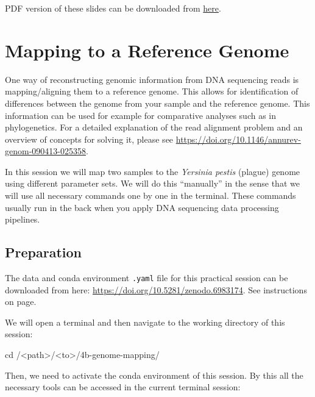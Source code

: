 \documentclass[
  letterpaper,
]{book}
\newenvironment{Shaded}{}{}
\newcommand{\BuiltInTok}[1]{\textcolor[rgb]{0.84,0.23,0.29}{#1}}
\newcommand{\NormalTok}[1]{\textcolor[rgb]{0.14,0.16,0.18}{#1}}
\newcommand{\OperatorTok}[1]{\textcolor[rgb]{0.14,0.16,0.18}{#1}}
\begin{document}
PDF version of these slides can be downloaded from
\href{assets/images/chapters/genome-mapping/SPAAM\%20Summer\%20School\%202022\%20-\%204B\%20-\%20Genome\%20Mapping.pdf}{here}.

\hypertarget{mapping-to-a-reference-genome}{%
\section{Mapping to a Reference
Genome}\label{mapping-to-a-reference-genome}}

One way of reconstructing genomic information from DNA sequencing reads
is mapping/aligning them to a reference genome. This allows for
identification of differences between the genome from your sample and
the reference genome. This information can be used for example for
comparative analyses such as in phylogenetics. For a detailed
explanation of the read alignment problem and an overview of concepts
for solving it, please see
\url{https://doi.org/10.1146/annurev-genom-090413-025358}.

In this session we will map two samples to the \emph{Yersinia pestis}
(plague) genome using different parameter sets. We will do this
``manually'' in the sense that we will use all necessary commands one by
one in the terminal. These commands usually run in the back when you
apply DNA sequencing data processing pipelines.

\hypertarget{preparation-1}{%
\subsection{Preparation}\label{preparation-1}}

The data and conda environment \texttt{.yaml} file for this practical
session can be downloaded from here:
\url{https://doi.org/10.5281/zenodo.6983174}. See instructions on page.

We will open a terminal and then navigate to the working directory of
this session:

\begin{Shaded}
\begin{Highlighting}[]
\BuiltInTok{cd}\NormalTok{ /}\OperatorTok{\textless{}}\NormalTok{path}\OperatorTok{\textgreater{}}\NormalTok{/}\OperatorTok{\textless{}}\NormalTok{to}\OperatorTok{\textgreater{}}\NormalTok{/4b{-}genome{-}mapping/}
\end{Highlighting}
\end{Shaded}

Then, we need to activate the conda environment of this session. By this
all the necessary tools can be accessed in the current terminal session:
\end{document}
